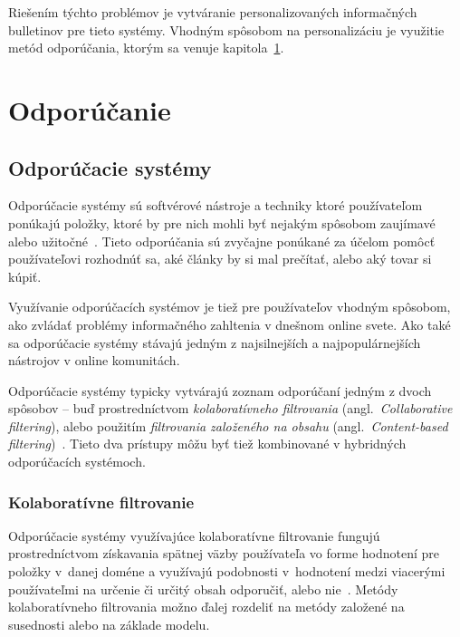 Riešením týchto problémov je vytváranie personalizovaných informačných bulletinov pre tieto systémy. Vhodným spôsobom
na personalizáciu je využitie metód odporúčania, ktorým sa venuje kapitola~\ref{rec}.





\chapter{Odporúčanie}\label{rec}

\section{Odporúčacie systémy}

Odporúčacie systémy sú softvérové nástroje a techniky ktoré používateľom ponúkajú položky, ktoré by pre nich mohli
byť nejakým spôsobom zaujímavé alebo užitočné~\cite{Handbook2011}. Tieto odporúčania sú zvyčajne ponúkané za účelom
pomôcť používateľovi rozhodnúť sa, aké články by si mal prečítať, alebo aký tovar si kúpiť.

Využívanie odporúčacích systémov je tiež pre používateľov vhodným spôsobom, ako zvládať problémy informačného zahltenia
v dnešnom online svete. Ako také sa odporúčacie systémy stávajú jedným z najsilnejších a najpopulárnejších nástrojov
v online komunitách.

Odporúčacie systémy typicky vytvárajú zoznam odporúčaní jedným z dvoch spôsobov -- buď prostredníctvom \emph{kolaboratívneho
filtrovania} (angl.~\emph{Collaborative filtering}), alebo použitím \emph{filtrovania založeného na obsahu}
(angl.~\emph{Content-based filtering})~\cite{Buhmann2011}. Tieto dva prístupy môžu byť tiež kombinované
v hybridných odporúčacích systémoch.

\subsection{Kolaboratívne filtrovanie}\label{rec:collab}

Odporúčacie systémy využívajúce kolaboratívne filtrovanie fungujú prostredníctvom získavania spätnej väzby používateľa
vo forme hodnotení pre položky v~danej doméne a využívajú podobnosti v~hodnotení medzi viacerými používateľmi na určenie
či určitý obsah odporučiť, alebo nie~\cite{Buhmann2011}. Metódy kolaboratívneho filtrovania možno ďalej rozdeliť
na metódy založené na susednosti alebo na základe modelu.

